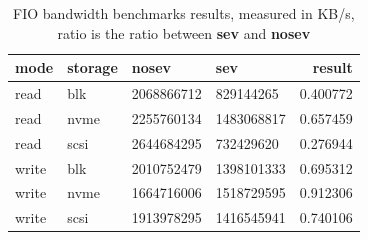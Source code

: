 \documentclass[twocolumn]{article}
\begin{document}
\begin{table}
    \small
    \begin{tabular}{llllr}
        \hline
        \textbf{mode} & \textbf{storage} & \textbf{nosev} & \textbf{sev} & \textbf{result} \\
        \hline
        read          & blk              & 2068866712     & 829144265    & 0.400772 \\
        read          & nvme             & 2255760134     & 1483068817   & 0.657459 \\
        read          & scsi             & 2644684295     & 732429620    & 0.276944 \\
        write         & blk              & 2010752479     & 1398101333   & 0.695312 \\
        write         & nvme             & 1664716006     & 1518729595   & 0.912306 \\
        write         & scsi             & 1913978295     & 1416545941   & 0.740106 \\
        \hline
    \end{tabular}
    \caption{FIO bandwidth benchmarks results, measured in KB/s,  ratio is the ratio between \textbf{sev} and \textbf{nosev}}
    \label{tab:fio-bw-ratios}
\end{table}
\end{document}
